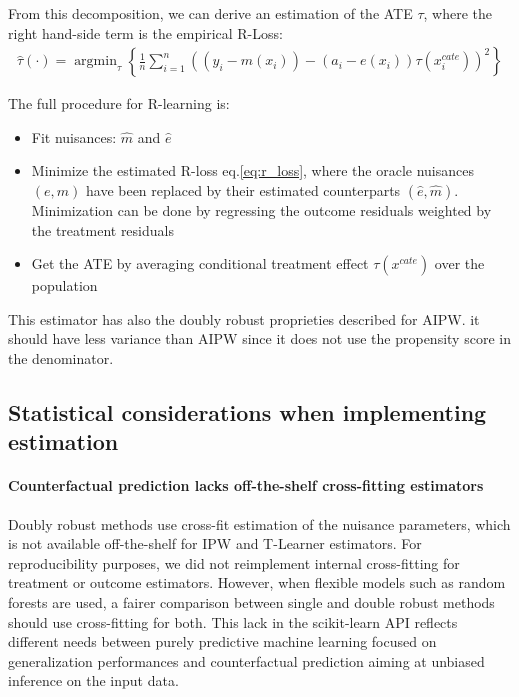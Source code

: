 \documentclass[french,12pt,twoside,a4paper]{book}
\begin{document}
\begin{appendices}
  From this decomposition, we can derive an estimation of the ATE $\tau$, where
  the right hand-side term is the empirical R-Loss:
  \begin{align}\label{eq:r_loss}
    \hat{\tau}(\cdot)=\operatorname{argmin}_{\tau}\left\{\frac{1}{n} \sum_{i=1}^{n}\left(\left(y_{i}-m\left(x_{i}\right)\right)-\left(a_{i}-e(x_{i})\right) \tau\left(x^{cate}_{i}\right)\right)^{2}\right\}
  \end{align}

  The full procedure for R-learning is:
  \begin{itemize}
    \item Fit nuisances: $\hat m$ and $\hat e$
    \item Minimize the estimated R-loss eq.\ref{eq:r_loss}, where the oracle nuisances $(e, m)$
          have been replaced by their estimated counterparts $(\hat e, \hat m)$.
          Minimization can be done by regressing the outcome residuals weighted by the
          treatment residuals
    \item Get the ATE by averaging conditional treatment effect $\tau(x^{cate})$ over the population
  \end{itemize}

  This estimator has also the doubly robust proprieties described for AIPW. it
  should have less variance than AIPW since it does not use the propensity score
  in the denominator.


  \subsection{Statistical considerations when implementing
    estimation}\label{apd:statistical_considerations}

  \paragraph{Counterfactual prediction lacks off-the-shelf cross-fitting estimators}

  Doubly robust methods use cross-fit estimation of the nuisance parameters, which
  is not available off-the-shelf for IPW and T-Learner estimators. For
  reproducibility purposes, we did not reimplement internal cross-fitting for
  treatment or outcome estimators. However, when flexible models such as random
  forests are used, a fairer comparison between single and double robust methods
  should use cross-fitting for both. This lack in the scikit-learn API reflects
  different needs between purely predictive machine learning focused on
  generalization performances and counterfactual prediction aiming at unbiased
  inference on the input data.


\end{appendices}
\end{document}
